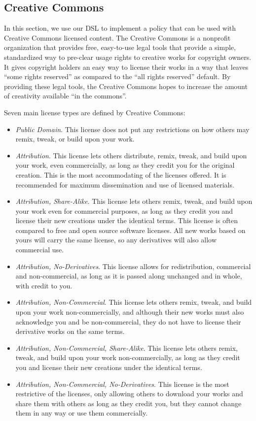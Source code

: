 \subsection{Creative Commons}\label{sec:model-cc}

In this section, we use our DSL to implement a policy that can be used with
Creative Commons licensed content.  The Creative Commons is a nonprofit
organization that provides free, easy-to-use legal tools that provide a simple,
standardized way to pre-clear usage rights to creative works for copyright
owners.  It gives copyright holders an easy way to license their works in a way
that leaves ``some rights reserved'' as compared to the ``all rights reserved''
default.  By providing these legal tools, the Creative Commons hopes to
increase the amount of creativity available ``in the commons''.

Seven main license types are defined by Creative Commons:

\begin{itemize}
\item \textit{Public Domain}. This license does not put any restrictions on how others may remix, tweak, or
build upon your work.
\item \textit{Attribution}.  This license lets others distribute, remix, tweak, and build upon your work,
even commercially, as long as they credit you for the original creation. This
is the most accommodating of the licenses offered.  It is recommended for
maximum dissemination and use of licensed materials.
\item \textit{Attribution, Share-Alike}.  This license lets others remix, tweak, and build upon your work even for
commercial purposes, as long as they credit you and license their new creations
under the identical terms.  This license is often compared to free and open
source software licenses.  All new works based on yours will carry the same
license, so any derivatives will also allow commercial use.
\item \textit{Attribution, No-Derivatives}.  This license allows for redistribution, commercial and non-commercial, as long
as it is passed along unchanged and in whole, with credit to you.
\item \textit{Attribution, Non-Commercial}.  This license lets others remix, tweak, and build upon your work
non-commercially, and although their new works must also acknowledge you and be
non-commercial, they do not have to license their derivative works on the same
terms.
\item \textit{Attribution, Non-Commercial, Share-Alike}.  This license lets others remix, tweak, and build upon your work
non-commercially, as long as they credit you and license their new creations
under the identical terms.
\item \textit{Attribution, Non-Commercial, No-Derivatives}.  This license is the most restrictive of the licenses, only allowing others to
download your works and share them with others as long as they credit you, but
they cannot change them in any way or use them commercially.
\end{itemize}

